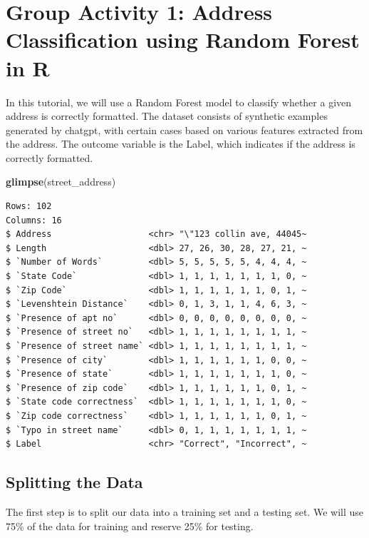 \documentclass[
]{book}
\newenvironment{Shaded}{\begin{snugshade}}{\end{snugshade}}
\newcommand{\FunctionTok}[1]{\textcolor[rgb]{0.13,0.29,0.53}{\textbf{#1}}}
\newcommand{\NormalTok}[1]{#1}
\begin{document}
\hypertarget{group-activity-1-address-classification-using-random-forest-in-r}{%
\section{Group Activity 1: Address Classification using Random Forest in R}\label{group-activity-1-address-classification-using-random-forest-in-r}}

In this tutorial, we will use a Random Forest model to classify whether a given address is correctly formatted. The dataset consists of synthetic examples generated by chatgpt, with certain cases based on various features extracted from the address. The outcome variable is the Label, which indicates if the address is correctly formatted.

\begin{Shaded}
\begin{Highlighting}[]
\FunctionTok{glimpse}\NormalTok{(street\_address)}
\end{Highlighting}
\end{Shaded}

\begin{verbatim}
Rows: 102
Columns: 16
$ Address                   <chr> "\"123 collin ave, 44045~
$ Length                    <dbl> 27, 26, 30, 28, 27, 21, ~
$ `Number of Words`         <dbl> 5, 5, 5, 5, 5, 4, 4, 4, ~
$ `State Code`              <dbl> 1, 1, 1, 1, 1, 1, 1, 0, ~
$ `Zip Code`                <dbl> 1, 1, 1, 1, 1, 1, 0, 1, ~
$ `Levenshtein Distance`    <dbl> 0, 1, 3, 1, 1, 4, 6, 3, ~
$ `Presence of apt no`      <dbl> 0, 0, 0, 0, 0, 0, 0, 0, ~
$ `Presence of street no`   <dbl> 1, 1, 1, 1, 1, 1, 1, 1, ~
$ `Presence of street name` <dbl> 1, 1, 1, 1, 1, 1, 1, 1, ~
$ `Presence of city`        <dbl> 1, 1, 1, 1, 1, 1, 0, 0, ~
$ `Presence of state`       <dbl> 1, 1, 1, 1, 1, 1, 1, 0, ~
$ `Presence of zip code`    <dbl> 1, 1, 1, 1, 1, 1, 0, 1, ~
$ `State code correctness`  <dbl> 1, 1, 1, 1, 1, 1, 1, 0, ~
$ `Zip code correctness`    <dbl> 1, 1, 1, 1, 1, 1, 0, 1, ~
$ `Typo in street name`     <dbl> 0, 1, 1, 1, 1, 1, 1, 1, ~
$ Label                     <chr> "Correct", "Incorrect", ~
\end{verbatim}

\hypertarget{splitting-the-data}{%
\subsection{Splitting the Data}\label{splitting-the-data}}

The first step is to split our data into a training set and a testing set. We will use 75\% of the data for training and reserve 25\% for testing.
\end{document}
